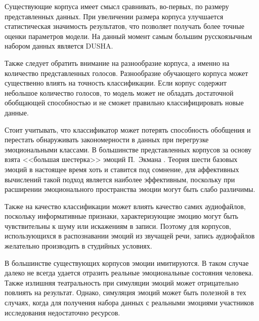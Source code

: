 Существующие корпуса имеет смысл сравнивать, во-первых, по размеру представленных данных. При увеличении размера корпуса улучшается статистическая значимость результатов, что позволяет получать более точные оценки параметров модели. На данный момент самым большим русскоязычным набором данных является DUSHA. 

Также следует обратить внимание на разнообразие корпуса, а именно на количество представленных голосов. Разнообразие обучающего корпуса может существенно влиять на точность классификации. Если корпус содержит небольшое количество голосов, то модель может не обладать достаточной обобщающей способностью и не сможет правильно классифицировать новые данные.

Стоит учитывать, что классификатор может потерять способность обобщения и перестать обнаруживать закономерности в данных при перегрузке эмоциональными классами. В большинстве представленных корпусов за основу взята <<большая шестерка>> эмоций П.~Экмана \cite{Ekman1972}. Теория шести базовых эмоций в настоящее время хоть и ставится под сомнение, для аффективных вычислений такой подход является наиболее эффективным, поскольку при расширении эмоционального пространства эмоции могут быть слабо различимы. 

Также на качество классификации может влиять качество самих аудиофайлов, поскольку информативные признаки, характеризующие эмоцию могут быть чувствительны к шуму или искажениям в записи. Поэтому для корпусов, использующихся в распознавании эмоций из звучащей речи, запись аудиофайлов желательно производить в студийных условиях.

В большинстве существующих корпусов эмоции имитируются. В таком случае далеко не всегда удается отразить реальные эмоциональные состояния человека. Также излишняя театральность при симуляции эмоций может отрицательно повлиять на результат. Однако, симуляция эмоций может быть полезной в тех случаях, когда для получения набора данных с реальными эмоциями участников исследования недостаточно ресурсов.

